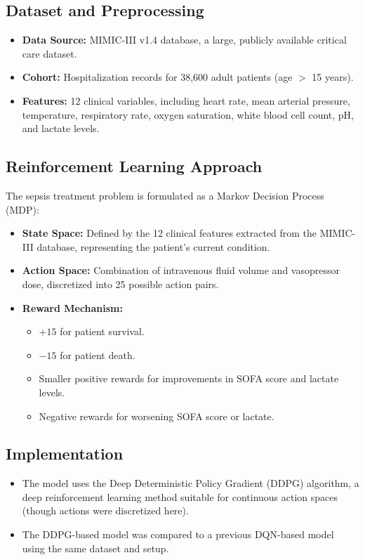 \subsection*{Dataset and Preprocessing}
\begin{itemize}
    \item \textbf{Data Source:} MIMIC-III v1.4 database, a large, publicly available critical care dataset.
    \item \textbf{Cohort:} Hospitalization records for 38,600 adult patients (age $>$ 15 years).
    \item \textbf{Features:} 12 clinical variables, including heart rate, mean arterial pressure, temperature, respiratory rate, oxygen saturation, white blood cell count, pH, and lactate levels.
\end{itemize}

\subsection*{Reinforcement Learning Approach}
The sepsis treatment problem is formulated as a Markov Decision Process (MDP):

\begin{itemize}
    \item \textbf{State Space:} Defined by the 12 clinical features extracted from the MIMIC-III database, representing the patient's current condition.
    \item \textbf{Action Space:} Combination of intravenous fluid volume and vasopressor dose, discretized into 25 possible action pairs.
    \item \textbf{Reward Mechanism:}
    \begin{itemize}
        \item $+15$ for patient survival.
        \item $-15$ for patient death.
        \item Smaller positive rewards for improvements in SOFA score and lactate levels.
        \item Negative rewards for worsening SOFA score or lactate.
    \end{itemize}
\end{itemize}

\subsection*{Implementation}
\begin{itemize}
    \item The model uses the Deep Deterministic Policy Gradient (DDPG) algorithm, a deep reinforcement learning method suitable for continuous action spaces (though actions were discretized here).
    \item The DDPG-based model was compared to a previous DQN-based model using the same dataset and setup.
\end{itemize}

